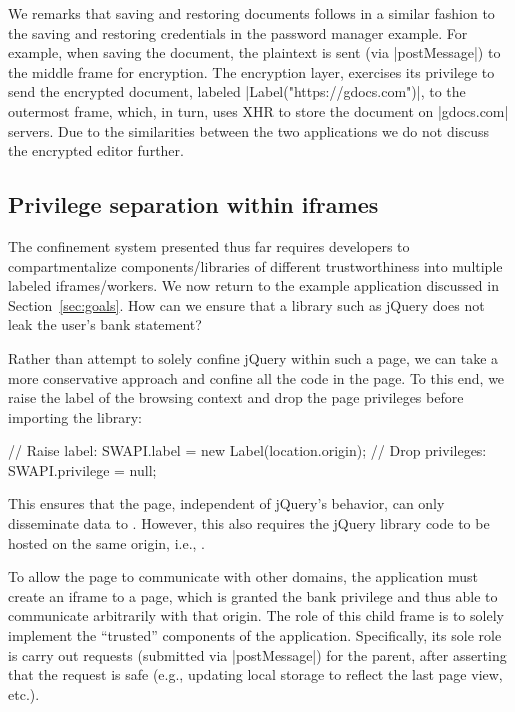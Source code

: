 We remarks that saving and restoring documents follows in a similar
fashion to the saving and restoring credentials in the password
manager example.  For example, when saving the document, the plaintext
is sent (via \js|postMessage|) to the middle frame for encryption.
The encryption layer, exercises its privilege  to
send the encrypted document, labeled \js|Label("https://gdocs.com")|,
to the outermost frame, which, in turn, uses XHR to store the document
on \js|gdocs.com| servers. Due to the similarities between the two
applications we do not discuss the encrypted editor further.


\subsection{Privilege separation within iframes}
\label{sec:system:script}

The confinement system presented thus far requires developers to
compartmentalize components/libraries of different trustworthiness into
multiple labeled iframes/workers.
%
%
We now return to the  example application discussed in
Section~\ref{sec:goals}. How can we ensure that a library such as
jQuery does not leak the user's bank statement?

Rather than attempt to solely confine jQuery within such a page, we
can take a more conservative approach and confine all the code in the
page.
%
To this end, we raise the label of the browsing context and drop the
page privileges before importing the library:
\begin{jscode}
// Raise label:
SWAPI.label = new Label(location.origin);
// Drop privileges:
SWAPI.privilege = null;
\end{jscode}
%
This ensures that the page, independent of jQuery's behavior, can only
disseminate data to .
%
However, this also requires the jQuery library code to be hosted on
the same origin, i.e., .
%

To allow the page to communicate with other domains, the application
must create an iframe to a  page, which is granted the
bank privilege and thus able to communicate arbitrarily with that origin.
%
The role of this child frame is to solely implement the ``trusted''
components of the application.
%
Specifically, its sole role is carry out requests (submitted via
\js|postMessage|) for the parent, after asserting that the request is
safe (e.g., updating local storage to reflect the last page view,
etc.).


